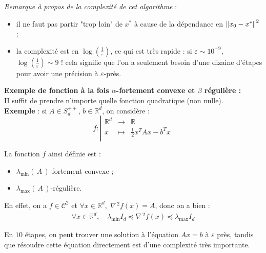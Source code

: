 \documentclass[11pt]{article}
\newcommand{\transpose}[1]{\ensuremath{#1^{\scriptscriptstyle T}}}
\newcommand{\dotpourvariable}{\:\cdot\:}
\newcommand{\ifempty}[3]{\ifx\hfuzz#1\hfuzz #2 \else #3\fi}
\newcommand{\norme}[1]{\left\lVert\ifempty{#1}{\dotpourvariable}{#1}\right\rVert}
\newcommand{\prt}[1]{\left( \, #1  \, \right)}
\newcommand{\R}{\mathbb{R}} %
\begin{document}
\textit{Remarque à propos de la complexité de cet algorithme} :
\begin{itemize}
  \item il ne faut pas partir "trop loin" de $x^{*}$ à cause de la dépendance en $\norme{x_0-x^{*}}^2$ ;
  \item la complexité est en $\log(\frac{1}{\varepsilon})$, ce qui est très rapide : si $\varepsilon \sim 10^{-9}$, $\log(\frac{1}{\varepsilon}) \sim 9$ ! cela signifie que l'on a seulement besoin
 d'une dizaine d'étapes pour avoir une précision à $\varepsilon$-près. \\

\end{itemize}

\textbf{Exemple de fonction à la fois $\alpha$-fortement convexe et
 $\beta$ régulière :} \\

 II suffit de prendre n'importe quelle fonction quadratique (non nulle).\\

\textbf{Exemple} : si $A \in S_d^{++}$, $b \in \R^d$, on considère : \\

\begin{displaymath}
f:
\left|
  \begin{array}{rcl}
    \R^d & \longrightarrow  & \R \\
    x & \longmapsto &  \frac{1}{2} \transpose{x}Ax-\transpose{b}x \\
  \end{array}
\right.
\end{displaymath}

La fonction $f$ ainsi définie est :
 \begin{itemize}
   \item $\lambda_{\min}\prt{A}$-fortement-convexe ;
   \item $\lambda_{\max}\prt{A}$-régulière. \\
 \end{itemize}

 En effet, on a $f \in \mathcal{C}^2$ et $ \forall x \in \R^d, \; \nabla\!^{\,2}f(x) = A$,
 donc on a bien :
 \begin{align*}
   \forall x \in \R^d, \quad \lambda_{\min} I_d \preceq  \nabla\!^{\,2}f(x) \preceq
   \lambda_{\max} I_d
 \end{align*}

 En $10$ étapes, on peut trouver une solution à l'équation $Ax= b$ à $\varepsilon$
 près, tandis que résoudre cette équation directement est d'une complexité très importante. \\
\end{document}

